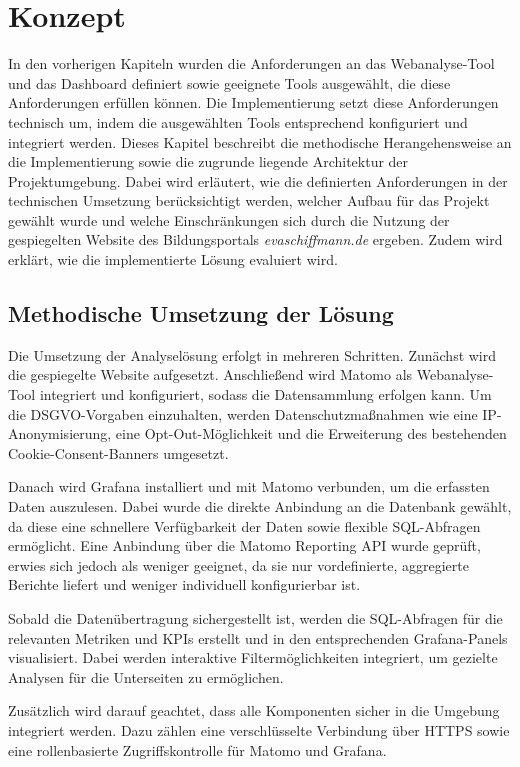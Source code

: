 \chapter{Konzept} %
\label{ch:konzept}
In den vorherigen Kapiteln wurden die Anforderungen an das Webanalyse-Tool und das Dashboard definiert sowie geeignete Tools ausgewählt, die diese Anforderungen erfüllen können. Die Implementierung setzt diese Anforderungen technisch um, indem die ausgewählten Tools entsprechend konfiguriert und integriert werden. Dieses Kapitel beschreibt die methodische Herangehensweise an die Implementierung sowie die zugrunde liegende Architektur der Projektumgebung. Dabei wird erläutert, wie die definierten Anforderungen in der technischen Umsetzung berücksichtigt werden, welcher Aufbau für das Projekt gewählt wurde und welche Einschränkungen sich durch die Nutzung der gespiegelten Website des Bildungsportals \textit{evaschiffmann.de} ergeben. Zudem wird erklärt, wie die implementierte Lösung evaluiert wird.

\section{Methodische Umsetzung der Lösung}
\label{sec:umsetzungloesung}
Die Umsetzung der Analyselösung erfolgt in mehreren Schritten. Zunächst wird die gespiegelte Website aufgesetzt. Anschließend wird Matomo als Webanalyse-Tool integriert und konfiguriert, sodass die Datensammlung erfolgen kann. Um die DSGVO-Vorgaben einzuhalten, werden Datenschutzmaßnahmen wie eine IP-Anonymisierung, eine Opt-Out-Möglichkeit und die Erweiterung des bestehenden Cookie-Consent-Banners umgesetzt.

Danach wird Grafana installiert und mit Matomo verbunden, um die erfassten Daten auszulesen. Dabei wurde die direkte Anbindung an die Datenbank gewählt, da diese eine schnellere Verfügbarkeit der Daten sowie flexible SQL-Abfragen ermöglicht. Eine Anbindung über die Matomo Reporting API wurde geprüft, erwies sich jedoch als weniger geeignet, da sie nur vordefinierte, aggregierte Berichte liefert und weniger individuell konfigurierbar ist.

Sobald die Datenübertragung sichergestellt ist, werden die SQL-Abfragen für die relevanten Metriken und KPIs erstellt und in den entsprechenden Grafana-Panels visualisiert. Dabei werden interaktive Filtermöglichkeiten integriert, um gezielte Analysen für die Unterseiten zu ermöglichen.

Zusätzlich wird darauf geachtet, dass alle Komponenten sicher in die Umgebung integriert werden. Dazu zählen eine verschlüsselte Verbindung über HTTPS sowie eine rollenbasierte Zugriffskontrolle für Matomo und Grafana.

